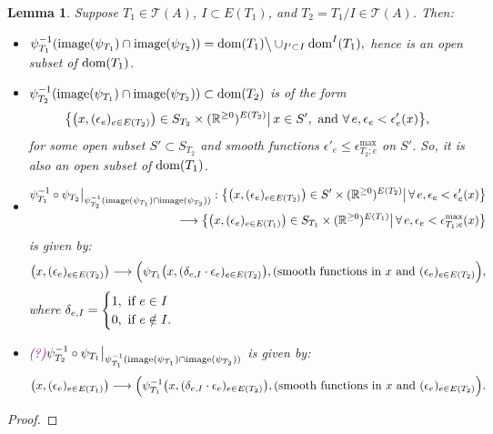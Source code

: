 \documentclass[11pt]{article}
\newtheorem{lmm}[thm]{Lemma}
\theoremstyle{definition}
\theoremstyle{remark}
\def\R{\mathbb{R}}
\def\cT{\mathcal{T}}
\def\dom{{\tn{dom}}}
\def\cmt#1{\textcolor{purple}{(#1)}}
\def\tn#1{\textnormal{#1}}
\begin{document}
\begin{lmm}
Suppose $T_1\in\cT(A)$, $I\subset E(T_1)$, and $T_2=T_1/I\in \cT(A)$. Then:
\begin{itemize}
\item $\psi_{T_1}^{-1}(\tn{image}(\psi_{T_1})\cap\tn{image}(\psi_{T_2}))=\dom(T_1)\big\backslash\cup_{I'\subset I}\dom^I(T_1),$ hence is an open subset of $\dom(T_1)$. 
\item $\psi_{T_2}^{-1}(\tn{image}(\psi_{T_1})\cap\tn{image}(\psi_{T_2}))\subset\dom(T_2)$ is of the form 
$$\big\{\big(x,(\epsilon_e)_{e\in E(T_2)}\big)\in 
S_{T_2}\times(\R^{\ge0})^{E(T_2)}\big|\,x\in S',\tn{ and }\forall\,e, \epsilon_e<\epsilon'_e(x)\big\},$$
for some open subset $S'\subset S_{T_2}$ and smooth functions $\epsilon'_e\le \epsilon^{\max}_{T_2;e}$  on $S'$.
So, it is also an open subset of $\dom(T_1)$.  
\item 
\begin{align*}
\psi_{T_1}^{-1}\circ\psi_{T_2}\big|_{\psi_{T_2}^{-1}(\tn{image}(\psi_{T_1})\cap\tn{image}(\psi_{T_2}))}:
\big\{\big(x,(\epsilon_e)_{e\in E(T_2)}\big)\in S'\times(\R^{\ge0})^{E(T_2)}\big|\,\forall\,e, \epsilon_e<\epsilon'_e(x)\big\}\\
\longrightarrow
\big\{\big(x,(\epsilon_e)_{e\in E(T_1)}\big)\in S_{T_1}\times(\R^{\ge0})^{E(T_1)}\big|\,\forall\,e, \epsilon_e<\epsilon^{\max}_{T_1;e}(x)\big\}
\end{align*}
is given by: 
$$
\big(x,(\epsilon_e)_{e\in E(T_2)}\big)\longrightarrow \Big( 
\psi_{T_1}\big(x,(\delta_{e,I}\cdot\epsilon_e)_{e\in E(T_2)}\big), (\tn{smooth functions in }x\tn{ and }(\epsilon_e)_{e\in E(T_2)}
\Big), 
$$
where $\delta_{e,I}=\begin{cases}1, \tn{ if }e\in I\\ 0, \tn{ if }e\notin I.\end{cases}$

\item 
\cmt{?}$\psi_{T_2}^{-1}\circ\psi_{T_1}\big|_{\psi_{T_1}^{-1}(\tn{image}(\psi_{T_1})\cap\tn{image}(\psi_{T_2}))}$
is given by: 
$$
\big(x,(\epsilon_e)_{e\in E(T_1)}\big)\longrightarrow \Big( 
\psi_{T_1}^{-1}\big(x,(\delta_{e,I}\cdot\epsilon_e)_{e\in E(T_2)}\big), (\tn{smooth functions in }x\tn{ and }(\epsilon_e)_{e\in E(T_2)}
\Big). 
$$
\end{itemize}
\end{lmm}

\begin{proof}

\end{proof}
\end{document}
